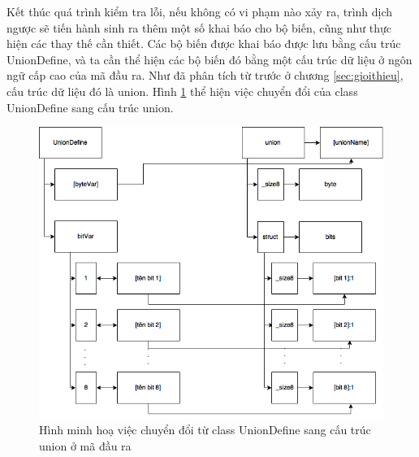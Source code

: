 Kết thúc quá trình kiểm tra lỗi, nếu không có vi phạm nào xảy ra, trình dịch ngược sẽ tiến hành sinh ra thêm một số khai báo cho bộ biến, cũng như thực hiện các thay thế cần thiết. Các bộ biến được khai báo được lưu bằng cấu trúc UnionDefine, và ta cần thể hiện các bộ biến đó bằng một cấu trúc dữ liệu ở ngôn ngữ cấp cao của mã đầu ra. Như đã phân tích từ trước ở chương \ref{sec:gioithieu}, cấu trúc dữ liệu đó là union. Hình \ref{fig:uniondefinemapping} thể hiện việc chuyển đổi của class UnionDefine sang cấu trúc union.

\begin{figure}
	\centering
	\includegraphics[width=0.7\linewidth]{image/unionDefineMapping}
	\caption{Hình minh hoạ việc chuyển đổi từ class UnionDefine sang cấu trúc union ở mã đầu ra}
	\label{fig:uniondefinemapping}
\end{figure}

